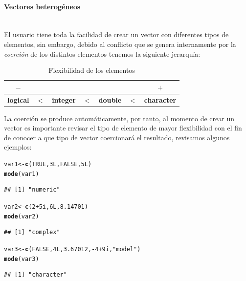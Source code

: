 \documentclass[11pt,a4paper,oneside]{book}\usepackage[]{graphicx}\usepackage[]{color}
\makeatletter
\newcommand{\hlnum}[1]{\textcolor[rgb]{0.686,0.059,0.569}{#1}}%
\newcommand{\hlstr}[1]{\textcolor[rgb]{0.192,0.494,0.8}{#1}}%
\newcommand{\hlopt}[1]{\textcolor[rgb]{0,0,0}{#1}}%
\newcommand{\hlstd}[1]{\textcolor[rgb]{0.345,0.345,0.345}{#1}}%
\newcommand{\hlkwb}[1]{\textcolor[rgb]{0.69,0.353,0.396}{#1}}%
\newcommand{\hlkwd}[1]{\textcolor[rgb]{0.737,0.353,0.396}{\textbf{#1}}}%
\newenvironment{kframe}{%
 \def\at@end@of@kframe{}%
 \ifinner\ifhmode%
  \def\at@end@of@kframe{\end{minipage}}%
  \begin{minipage}{\columnwidth}%
 \fi\fi%
 \def\FrameCommand##1{\hskip\@totalleftmargin \hskip-\fboxsep
 \colorbox{shadecolor}{##1}\hskip-\fboxsep
     \hskip-\linewidth \hskip-\@totalleftmargin \hskip\columnwidth}%
 \MakeFramed {\advance\hsize-\width
   \@totalleftmargin\z@ \linewidth\hsize
   \@setminipage}}%
 {\par\unskip\endMakeFramed%
 \at@end@of@kframe}
\newenvironment{knitrout}{}{} %
\makeatother
\begin{document}
\begin{itemize}
\paragraph{Vectores heterogéneos}
~\\

El usuario tiene toda la facilidad de crear un vector con diferentes tipos de elementos, sin embargo, debido al conflicto que se genera internamente por la \emph{coerción} de los distintos elementos tenemos la siguiente jerarquía:
\begin{table}[H]
\centering
\begin{tabular}{ccccccc} 
$-$ & & & & & & $+$\\ \hline
{\bf logical} & $<$ & {\bf integer} & $<$ & {\bf double} & $<$ & {\bf character} \\ \hline
\end{tabular}
\caption{Flexibilidad de los elementos}
\end{table}

La coerción se produce automáticamente, por tanto, al momento de crear un vector es importante revisar el tipo de elemento de mayor flexibilidad con el fin de conocer a que tipo de vector coercionará el resultado, revisamos algunos ejemplos:
\begin{knitrout}
\color{fgcolor}\begin{kframe}
\begin{alltt}
\hlstd{var1} \hlkwb{<-} \hlkwd{c}\hlstd{(}\hlnum{TRUE}\hlstd{,} \hlnum{3L}\hlstd{,} \hlnum{FALSE}\hlstd{,} \hlnum{5L}\hlstd{)}
\hlkwd{mode}\hlstd{(var1)}
\end{alltt}
\begin{verbatim}
## [1] "numeric"
\end{verbatim}
\begin{alltt}
\hlstd{var2} \hlkwb{<-} \hlkwd{c}\hlstd{(}\hlnum{2}\hlopt{+}\hlnum{5i}\hlstd{,} \hlnum{6L}\hlstd{,} \hlnum{8.14701}\hlstd{)}
\hlkwd{mode}\hlstd{(var2)}
\end{alltt}
\begin{verbatim}
## [1] "complex"
\end{verbatim}
\begin{alltt}
\hlstd{var3} \hlkwb{<-} \hlkwd{c}\hlstd{(}\hlnum{FALSE}\hlstd{,} \hlnum{4L}\hlstd{,} \hlnum{3.67012}\hlstd{,} \hlopt{-}\hlnum{4}\hlopt{+}\hlnum{9i}\hlstd{,} \hlstr{"model"}\hlstd{)}
\hlkwd{mode}\hlstd{(var3)}
\end{alltt}
\begin{verbatim}
## [1] "character"
\end{verbatim}
\end{kframe}
\end{knitrout}


\end{itemize}
\end{document}
